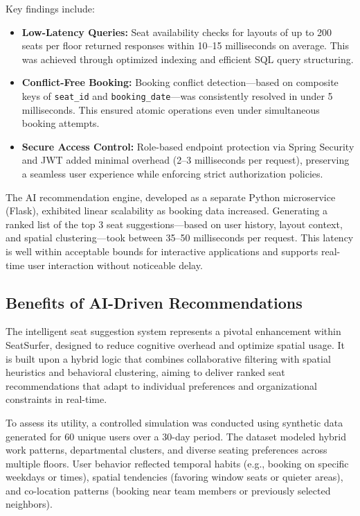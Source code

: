 \documentclass[onecolumn, 12pt]{IEEEtran}
\begin{document}
Key findings include:

\begin{itemize}
    \item \textbf{Low-Latency Queries:} Seat availability checks for layouts of up to 200 seats per floor returned responses within 10--15 milliseconds on average. This was achieved through optimized indexing and efficient SQL query structuring.
    
    \item \textbf{Conflict-Free Booking:} Booking conflict detection—based on composite keys of \texttt{seat\_id} and \texttt{booking\_date}—was consistently resolved in under 5 milliseconds. This ensured atomic operations even under simultaneous booking attempts.
    
    \item \textbf{Secure Access Control:} Role-based endpoint protection via Spring Security and JWT added minimal overhead (2--3 milliseconds per request), preserving a seamless user experience while enforcing strict authorization policies.
\end{itemize}

The AI recommendation engine, developed as a separate Python microservice (Flask), exhibited linear scalability as booking data increased. Generating a ranked list of the top 3 seat suggestions—based on user history, layout context, and spatial clustering—took between 35--50 milliseconds per request. This latency is well within acceptable bounds for interactive applications and supports real-time user interaction without noticeable delay.

\subsection{Benefits of AI-Driven Recommendations}

The intelligent seat suggestion system represents a pivotal enhancement within SeatSurfer, designed to reduce cognitive overhead and optimize spatial usage. It is built upon a hybrid logic that combines collaborative filtering with spatial heuristics and behavioral clustering, aiming to deliver ranked seat recommendations that adapt to individual preferences and organizational constraints in real-time.

To assess its utility, a controlled simulation was conducted using synthetic data generated for 60 unique users over a 30-day period. The dataset modeled hybrid work patterns, departmental clusters, and diverse seating preferences across multiple floors. User behavior reflected temporal habits (e.g., booking on specific weekdays or times), spatial tendencies (favoring window seats or quieter areas), and co-location patterns (booking near team members or previously selected neighbors).
\end{document}
